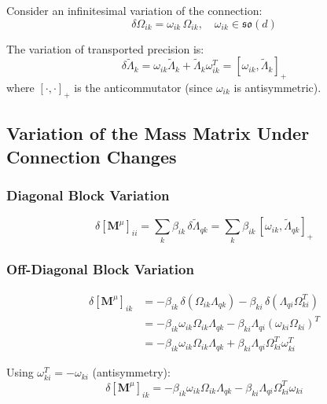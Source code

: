 \documentclass[12pt]{article}
\begin{document}
Consider an infinitesimal variation of the connection:
\begin{equation}
\delta\Omega_{ik} = \omega_{ik} \, \Omega_{ik}, \quad \omega_{ik} \in \mathfrak{so}(d)
\end{equation}

The variation of transported precision is:
\begin{equation}
\delta\tilde{\Lambda}_k = \omega_{ik}\tilde{\Lambda}_k + \tilde{\Lambda}_k\omega_{ik}^T = [\omega_{ik}, \tilde{\Lambda}_k]_+
\end{equation}
where $[\cdot,\cdot]_+$ is the anticommutator (since $\omega_{ik}$ is antisymmetric).

\subsection{Variation of the Mass Matrix Under Connection Changes}

\subsubsection{Diagonal Block Variation}

\begin{equation}
\delta[\mathbf{M}^\mu]_{ii} = \sum_k \beta_{ik} \, \delta\tilde{\Lambda}_{qk} = \sum_k \beta_{ik} \, [\omega_{ik}, \tilde{\Lambda}_{qk}]_+
\end{equation}

\subsubsection{Off-Diagonal Block Variation}

\begin{align}
\delta[\mathbf{M}^\mu]_{ik} &= -\beta_{ik} \, \delta(\Omega_{ik}\Lambda_{qk}) - \beta_{ki} \, \delta(\Lambda_{qi}\Omega_{ki}^T) \nonumber\\
&= -\beta_{ik}\omega_{ik}\Omega_{ik}\Lambda_{qk} - \beta_{ki}\Lambda_{qi}(\omega_{ki}\Omega_{ki})^T \nonumber\\
&= -\beta_{ik}\omega_{ik}\Omega_{ik}\Lambda_{qk} + \beta_{ki}\Lambda_{qi}\Omega_{ki}^T\omega_{ki}^T
\end{align}

Using $\omega_{ki}^T = -\omega_{ki}$ (antisymmetry):
\begin{equation}
\boxed{\delta[\mathbf{M}^\mu]_{ik} = -\beta_{ik}\omega_{ik}\Omega_{ik}\Lambda_{qk} - \beta_{ki}\Lambda_{qi}\Omega_{ki}^T\omega_{ki}}
\end{equation}
\end{document}
